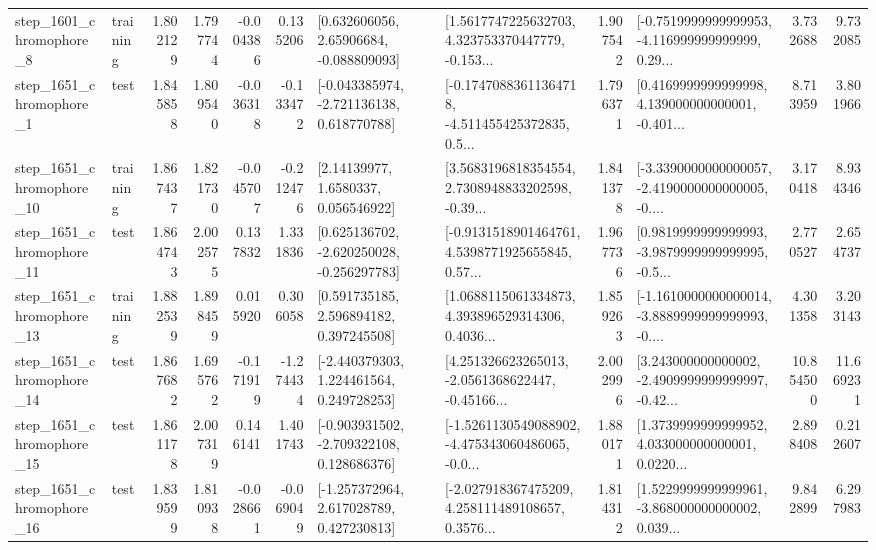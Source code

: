 \begin{tabular}{llrrrrllrlrr}
  step\_1601\_chromophore\_8 &  training &      1.802129 &    1.797744 &     -0.004386 &  0.135206 &     [0.632606056, 2.65906684, -0.088809093] &  [1.5617747225632703, 4.323753370447779, -0.153... &       1.907542 &  [-0.7519999999999953, -4.116999999999999, 0.29... &            3.732688 &          9.732085 \\
  step\_1651\_chromophore\_1 &      test &      1.845858 &    1.809540 &     -0.036318 & -0.133472 &   [-0.043385974, -2.721136138, 0.618770788] &  [-0.17470883611364718, -4.511455425372835, 0.5... &       1.796371 &  [0.4169999999999998, 4.139000000000001, -0.401... &            8.713959 &          3.801966 \\
 step\_1651\_chromophore\_10 &  training &      1.867437 &    1.821730 &     -0.045707 & -0.212476 &        [2.14139977, 1.6580337, 0.056546922] &  [3.5683196818354554, 2.7308948833202598, -0.39... &       1.841378 &  [-3.3390000000000057, -2.4190000000000005, -0.... &            3.170418 &          8.934346 \\
 step\_1651\_chromophore\_11 &      test &      1.864743 &    2.002575 &      0.137832 &  1.331836 &   [0.625136702, -2.620250028, -0.256297783] &  [-0.9131518901464761, 4.5398771925655845, 0.57... &       1.967736 &  [0.9819999999999993, -3.9879999999999995, -0.5... &            2.770527 &          2.654737 \\
 step\_1651\_chromophore\_13 &  training &      1.882539 &    1.898459 &      0.015920 &  0.306058 &     [0.591735185, 2.596894182, 0.397245508] &  [1.0688115061334873, 4.393896529314306, 0.4036... &       1.859263 &  [-1.1610000000000014, -3.8889999999999993, -0.... &            4.301358 &          3.203143 \\
 step\_1651\_chromophore\_14 &      test &      1.867682 &    1.695762 &     -0.171919 & -1.274434 &    [-2.440379303, 1.224461564, 0.249728253] &  [4.251326623265013, -2.0561368622447, -0.45166... &       2.002996 &  [3.243000000000002, -2.4909999999999997, -0.42... &           10.854500 &         11.669231 \\
 step\_1651\_chromophore\_15 &      test &      1.861178 &    2.007319 &      0.146141 &  1.401743 &   [-0.903931502, -2.709322108, 0.128686376] &  [-1.5261130549088902, -4.475343060486065, -0.0... &       1.880171 &  [1.3739999999999952, 4.033000000000001, 0.0220... &            2.898408 &          0.212607 \\
 step\_1651\_chromophore\_16 &      test &      1.839599 &    1.810938 &     -0.028661 & -0.069049 &    [-1.257372964, 2.617028789, 0.427230813] &  [-2.027918367475209, 4.258111489108657, 0.3576... &       1.814312 &  [1.5229999999999961, -3.868000000000002, 0.039... &            9.842899 &          6.297983 \\

\end{tabular}
